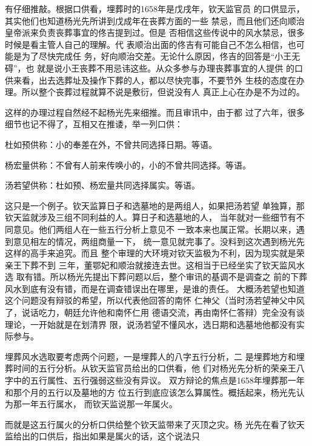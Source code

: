 有仔细推敲。根据口供看，埋葬时的1658年是戊戌年，钦天监官员%
的口供显示，其实他们也知道杨光先所讲到戊成年在丧葬方面的一些%
禁忌，而且他们还向顺治皇帝派来负责丧葬事宜的佟吉提到过。但是%
否相信这些传说中的风水禁忌，很多时候是看主管人自己的理解。代%
表顺治出面的佟吉有可能自己不怎么相信，也可能是为了尽快完成任%
务，好向顺治交差。无论什么原因，佟吉的回答是“小王无碍”，也%
就是说小王丧葬不用忌讳这些。从众多参与办理丧葬事宜的人提供%
的口供来看，出去选葬址及操作下葬的人，都以尽快完事，不要节外%
生枝的态度在办理。所以整个丧葬过程就算不说是敷衍，但说没有人%
真正上心在办是不为过的。%
\par
这样的办理过程自然经不起杨光先来细推。而且审讯中，由于都%
过了六年，很多细节也记不得了，互相又在推诿，举一列口供：%
\par
{\bookkai 杜如预供称：小的奉差在外，不曾共同选择日期。等语。}%
\par
{\bookkai 杨宏量供称：不曾有人前来传唤小的，小的不曾共同选择。等语。}%
\par
{\bookkai 汤若望供称：杜如预、杨宏量共同选择属实。等语。}%
\par
这只是一个例子。钦天监算日子和选墓地的是两组人，如果把汤若望%
单独算，那钦天监就涉及三组不同利益的人。算日子和选墓地的人，%
当年就对一些细节有不同意见。他们两组人在一些五行分析上意见不%
一致本来也属正常。长期以来，遇到意见相左的情况，两组商量一下，%
统一意见就完事了。没料到这次遇到杨光先这样的高手来追究。而且%
整个审理的大环境对钦天监极为不利，因为现实就是荣亲王下葬不到%
三年，董鄂妃和顺治就接连去世。这相当于已经坐实了钦天监风水选%
取有错。所以杨光先提出下葬问题以后，整个审讯的基调不是调查之%
前的下葬风水到底有没有错，而是在调查错误出在哪里，是谁的责任。%
大概汤若望也知道这个问题没有辩驳的希望，所以代表他回答的南怀%
仁神父（当时汤若望神父中风了，说话吃力，朝廷允许他和南怀仁用%
德语交流，再由南怀仁答辩）完全没有谈理论，一开始就是在划清界%
限，说汤若望不懂风水，选日期和选墓地他都没有实际参与。%
\par
埋葬风水选取要考虑两个问题，一是埋葬人的八字五行分析，二%
是埋葬地方和埋葬时间的五行分析。从钦天监官员给出的口供看，他%
们对杨光先分析的荣亲王八字中的五行属性、五行强弱这些没有异议。%
双方辩论的焦点是1658年埋葬那一年和那个月的五行以及墓地的方%
位五行到底应该怎么算属性。概括起来，杨光先认为那一年五行属水，%
而钦天监说那一年属火。%
\par
而就是这五行属火的分析口供给整个钦天监带来了灭顶之灾。杨%
光先在看了钦天监给出的口供后，指出如果是属火的话，这个说法只%
